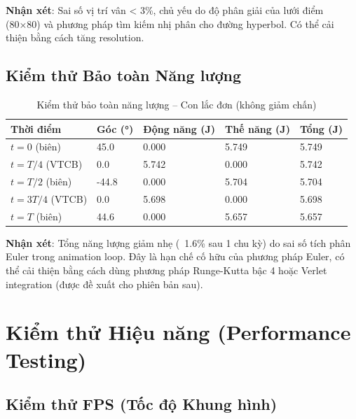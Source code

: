 \textbf{Nhận xét}: Sai số vị trí vân < 3\%, chủ yếu do độ phân giải của lưới điểm (80×80) và phương pháp tìm kiếm nhị phân cho đường hyperbol. Có thể cải thiện bằng cách tăng resolution.

\subsection{Kiểm thử Bảo toàn Năng lượng}

\begin{table}[H]
\centering
\caption{Kiểm thử bảo toàn năng lượng – Con lắc đơn (không giảm chấn)}
\begin{tabular}{|p{}|p{}|p{}|p{}|p{}|}
\hline
\textbf{Thời điểm} & \textbf{Góc (°)} & \textbf{Động năng (J)} & \textbf{Thế năng (J)} & \textbf{Tổng (J)} \\
\hline
$t = 0$ (biên) & 45.0 & 0.000 & 5.749 & 5.749 \\
\hline
$t = T/4$ (VTCB) & 0.0 & 5.742 & 0.000 & 5.742 \\
\hline
$t = T/2$ (biên) & -44.8 & 0.000 & 5.704 & 5.704 \\
\hline
$t = 3T/4$ (VTCB) & 0.0 & 5.698 & 0.000 & 5.698 \\
\hline
$t = T$ (biên) & 44.6 & 0.000 & 5.657 & 5.657 \\
\hline
\end{tabular}
\end{table}

\textbf{Nhận xét}: Tổng năng lượng giảm nhẹ (~1.6\% sau 1 chu kỳ) do sai số tích phân Euler trong animation loop. Đây là hạn chế cố hữu của phương pháp Euler, có thể cải thiện bằng cách dùng phương pháp Runge-Kutta bậc 4 hoặc Verlet integration (được đề xuất cho phiên bản sau).

\section{Kiểm thử Hiệu năng (Performance Testing)}

\subsection{Kiểm thử FPS (Tốc độ Khung hình)}


